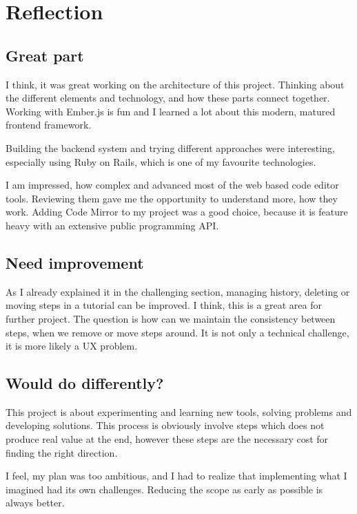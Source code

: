 \documentclass[11pt, a4paper, oneside, openright, medskipamount]{report}
\begin{document}
\section{Reflection}

\subsection{Great part}

I think, it was great working on the architecture of this project. Thinking about the different elements and technology, and how these parts connect together. Working with Ember.js is fun and I learned a lot about this modern, matured frontend framework.

Building the backend system and trying different approaches were interesting, especially using Ruby on Rails, which is one of my favourite technologies.

I am impressed, how complex and advanced most of the web based code editor tools. Reviewing them gave me the opportunity to understand more, how they work. Adding Code Mirror to my project was a good choice, because it is feature heavy with an extensive public programming API.

\subsection {Need improvement}

As I already explained it in the challenging section, managing history, deleting or moving steps in a tutorial can be improved. I think, this is a great area for further project. The question is how can we maintain the consistency between steps, when we remove or move steps around. It is not only a technical challenge, it is more likely a UX problem.

\subsection {Would do differently?}

This project is about experimenting and learning new tools, solving problems and developing solutions. This process is obviously involve steps which does not produce real value at the end, however these steps are the necessary cost for finding the right direction.

I feel, my plan was too ambitious, and I had to realize that implementing what I imagined had its own challenges. Reducing the scope as early as possible is always better.
\end{document}
